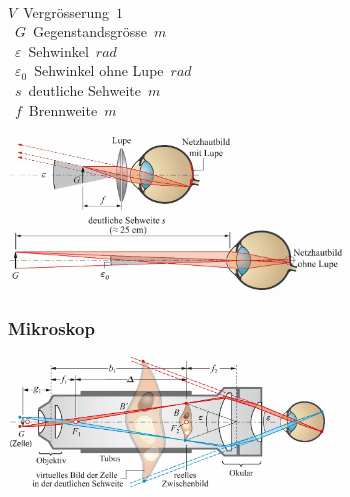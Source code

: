 \begin{center}
	\begin{minipage}{0.18\textwidth}
		\\
		
		\unit{$ V $}{Vergrösserung}{$1$} \\
		\unit{$ G $}{Gegenstandsgrösse}{$m$} \\
		\unit{$ \varepsilon $}{Sehwinkel}{$rad$} \\
		\unit{$ \varepsilon_0 $}{Sehwinkel ohne Lupe}{$rad$} \\
		\unit{$ s $}{deutliche Sehweite}{$m$} \\
		\unit{$ f $}{Brennweite}{$m$} \\
	\end{minipage}%
	\begin{minipage}{0.3\textwidth}
		\includegraphics[height=2cm,keepaspectratio=true]{Images/lupe.png}
		\includegraphics[height=2cm,keepaspectratio=true]{Images/deutliche_sichtweite.png}
	\end{minipage}
\end{center}





\subsubsection{Mikroskop}

\begin{center}
	\begin{minipage}{0.18\textwidth}
	\end{minipage}%
	\begin{minipage}{0.3\textwidth}
		\includegraphics[height=3.5cm,keepaspectratio=true]{Images/mikroskop.png}
	\end{minipage}
\end{center}

